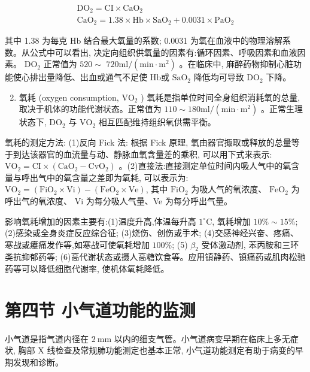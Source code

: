 \documentclass[10pt]{article}
\begin{document}
\[
\begin{gathered}
\mathrm{DO}_{2}=\mathrm{CI} \times \mathrm{CaO}_{2} \\
\mathrm{CaO}_{2}=1.38 \times \mathrm{Hb} \times \mathrm{SaO}_{2}+0.0031 \times \mathrm{PaO}_{2}
\end{gathered}
\]

其中 1.38 为每克 $\mathrm{Hb}$ 结合最大氧量的系数; 0.0031 为氧在血液中的物理溶解系数。从公式中可以看出, 决定向组织供氧量的因素有:循环因素、呼吸因素和血液因素。 $\mathrm{DO}_{2}$ 正常值为 $520 \sim$ $720 \mathrm{ml} /\left(\mathrm{min} \cdot \mathrm{m}^{2}\right)$ 。在临床中, 麻醉药物抑制心脏功能使心排出量降低、出血或通气不足使 $\mathrm{Hb}$或 $\mathrm{SaO}_{2}$ 降低均可导致 $\mathrm{DO}_{2}$ 下降。

\begin{enumerate}
  \setcounter{enumi}{1}
  \item 氧耗 (oxygen consumption, $\mathrm{VO}_{2}$ ) 氧耗是指单位时间全身组织消耗氧的总量, 取决于机体的功能代谢状态。正常值为 $110 \sim 180 \mathrm{ml} /\left(\mathrm{min} \cdot \mathrm{m}^{2}\right)$ 。正常生理状态下, $\mathrm{DO}_{2}$ 与 $\mathrm{VO}_{2}$ 相互匹配维持组织氧供需平衡。
\end{enumerate}

氧耗的测定方法: (1)反向 Fick 法: 根据 Fick 原理, 氧由器官掫取或释放的总量等于到达该器官的血流量与动、静脉血氧含量差的乘积, 可以用下式来表示: $\mathrm{VO}_{2}=\mathrm{CI} \times\left(\mathrm{CaO}_{2}-\mathrm{CvO}_{2}\right)$ 。(2)直接法:直接测定单位时间内吸人气中的氧含量与呼出气中的氧含量之差即为氧耗, 可以表示为: $\mathrm{VO}_{2}=\left(\mathrm{FiO}_{2} \times \mathrm{Vi}\right)-\left(\mathrm{FeO}_{2} \times \mathrm{Ve}\right)$, 其中 $\mathrm{FiO}_{2}$ 为吸人气的氧浓度、 $\mathrm{FeO}_{2}$ 为呼出气的氧浓度、 $\mathrm{Vi}$ 为每分吸人气量、Ve 为每分呼出气量。

影响氧耗增加的因素主要有:(1)温度升高,体温每升高 $1^{\circ} \mathrm{C}$, 氧耗增加 $10 \% \sim 15 \%$; (2)感染或全身炎症反应综合征; (3)烧伤、创伤或手术; (4)交感神经兴奋、疼痛、寒战或㿏痛发作等,如寒战可使氧耗增加 $100 \%$; (5) $\beta_{2}$ 受体激动剂, 苯丙胺和三环类抗抑郁药等; (6)高代谢状态或摄人高糖饮食等。应用镇静药、镇痛药或肌肉松驰药等可以降低细胞代谢率, 使机体氧耗降低。

\section*{第四节 小气道功能的监测}
小气道是指气道内径在 $2 \mathrm{~mm}$ 以内的细支气管。小气道病变早期在临床上多无症状, 胸部 X 线检查及常规肺功能测定也基本正常, 小气道功能测定有助于病变的早期发现和诊断。
\end{document}
